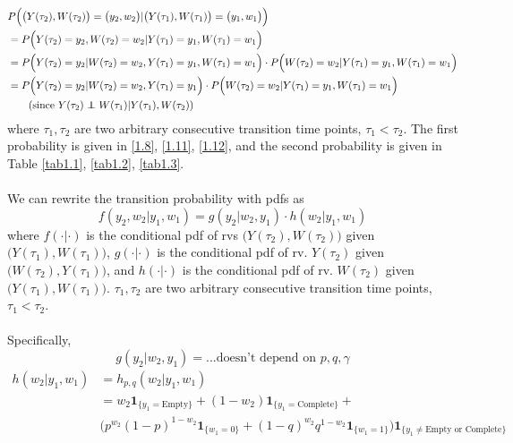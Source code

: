 \documentclass[10pt,letterpaper]{article}
\numberwithin{table}{section}
\numberwithin{figure}{section}
\numberwithin{equation}{section}
\newcommand\independent{\protect\mathpalette{\protect\independenT}{\perp}}
\def\independenT#1#2{\mathrel{\rlap{$#1#2$}\mkern2mu{#1#2}}}
\begin{document}
{{\begin{equation}
\begin{split}
&P \Big(
\big(Y(\tau_2),W(\tau_2)\big) = \big(y_2,w_2\big)|\big(Y(\tau_1), W(\tau_1)\big)  =  \big(y_1,w_1\big) 
\Big)\\
&= P\Big(
Y(\tau_2)=y_2,W(\tau_2) = w_2|Y(\tau_1) = y_1,W(\tau_1) = w_1
\Big) \\
&= P\Big(
Y(\tau_2)=y_2|W(\tau_2)=w_2,Y(\tau_1)=y_1,W(\tau_1)=w_1
\Big) 
\cdot
P\Big(
W(\tau_2)=w_2|Y(\tau_1)=y_1,W(\tau_1)=w_1
\Big) \\
&= P\Big(
Y(\tau_2)=y_2|W(\tau_2)=w_2,Y(\tau_1)=y_1
\Big) 
\cdot
P\Big(
W(\tau_2)=w_2|Y(\tau_1)=y_1,W(\tau_1)=w_1
\Big) \\ 
&\qquad (\text{since }Y(\tau_2) \independent W(\tau_{1}) | Y(\tau_{1}), W(\tau_{2}))\\
\end{split}
\end{equation}
where $\tau_1,\tau_2$ are two arbitrary consecutive transition time points, $\tau_1<\tau_2$. The first probability is given in \ref{1.8}, \ref{1.11}, \ref{1.12}, and the second probability is given in Table \ref{tab1.1}, \ref{tab1.2}, \ref{tab1.3}.
\\~\\
We can rewrite the transition probability with pdfs as 
\begin{equation}
\label{1.14}
f(y_2,w_2|y_1,w_1) = g (y_2|w_2,y_1) \cdot h(w_2|y_1,w_1)
\end{equation}
where $f(\cdot|\cdot)$ is the conditional pdf of rvs $\big(Y(\tau_2),W(\tau_2)\big)$ given $\big(Y(\tau_1),W(\tau_1)\big)$, $g(\cdot|\cdot)$ is the conditional pdf of rv. $Y(\tau_2)$ given $\big(W(\tau_2), Y(\tau_1)\big)$, and $h(\cdot|\cdot)$ is the conditional pdf of rv. $W(\tau_2)$ given $\big(Y(\tau_1), W(\tau_1)\big)$. $\tau_1,\tau_2$ are two arbitrary consecutive transition time points, $\tau_1<\tau_2$.
\\~\\
Specifically, 
\begin{equation}
g(y_2|w_2,y_1) = ... \text{doesn't depend on } p,q,\gamma
\end{equation}
\begin{equation}
\begin{split}
h(w_2|y_1,w_1) & = h_{p,q}(w_2|y_1,w_1) \\
& = w_2 \bm 1_{\{y_1 = \text{Empty} \}} + 
(1-w_2) \bm 1_{\{y_1 = \text{Complete} \}} + \\
&
\big(p^{w_2}(1-p)^{1-w_2} \bm 1_{\{w_1 = 0 \}} +
      (1-q)^{w_2}q^{1-w_2}  \bm 1_{\{w_1 = 1 \}}
 \big)
\bm 1_{\{y_1 \neq \text{Empty or Complete}  \}}
\end{split}
\end{equation}
}
}
\end{document}
